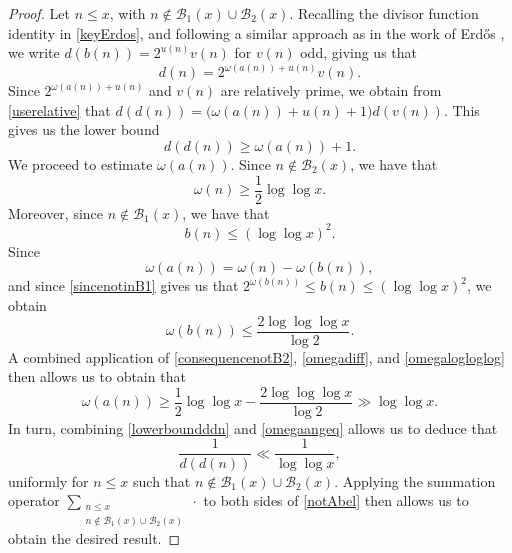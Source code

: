 \documentclass[12pt]{article}
\begin{document}
\begin{proof}
 Let \(n \le x\), with \(n \notin \mathcal{B}_1(x) \cup \mathcal{B}_2(x)\). Recalling the divisor function identity in \eqref{keyErdos}, and 
 following a similar approach as in the work of Erd\H{o}s \cite{Erdos1968}, we write $ d(b(n)) = 2^{u(n)} v(n)$ for $v(n)$ odd, giving 
 us that 
\begin{equation}\label{userelative}
 d(n) = 2^{\omega(a(n)) + u(n)} v(n).
\end{equation}
 Since $2^{\omega(a(n)) + u(n)}$ and $v(n)$ are relatively prime, we obtain from \eqref{userelative} that $ d(d(n)) = \big(\omega(a(n)) + 
 u(n) + 1\big) d(v(n))$. This gives us the lower bound 
\begin{equation}\label{lowerboundddn}
d(d(n)) \ge \omega(a(n)) + 1.
\end{equation}
 We proceed to estimate \(\omega(a(n))\). Since \(n\notin \mathcal B_2(x)\), we have that 
\begin{equation}\label{consequencenotB2}
\omega(n)\geq \frac12\log\log x.
\end{equation}
 Moreover, since \(n\notin \mathcal B_1(x)\), we have that 
\begin{equation}\label{sincenotinB1}
 b(n) \leq (\log\log x)^2.
\end{equation}
 Since 
\begin{equation}\label{omegadiff}
 \omega(a(n))=\omega(n)-\omega(b(n)), 
\end{equation}
 and since \eqref{sincenotinB1} gives us that 
$ 2^{\omega(b(n))} \leq b(n) \leq (\log\log x)^2$,
we obtain
\begin{equation}\label{omegalogloglog}
 \omega(b(n))\leq \frac{2\log\log\log x}{\log 2}.
\end{equation}
 A combined application of \eqref{consequencenotB2}, \eqref{omegadiff}, and \eqref{omegalogloglog} then allows us to obtain that 
\begin{equation}\label{omegaangeq}
 \omega(a(n)) \geq \frac12\log\log x - \frac{2\log\log\log x}{\log 2} \gg \log\log x.
\end{equation}
 In turn, combining \eqref{lowerboundddn} and \eqref{omegaangeq} allows us to deduce that 
\begin{equation}\label{notAbel}
 \frac{1}{d(d(n))} \ll \frac{1}{\log\log x}, 
\end{equation}
 uniformly for $n \leq x$ such that $n \not\in \mathcal{B}_{1}(x) \cup \mathcal{B}_{2}(x)$. Applying the summation operator 
 $\sum_{\substack{n \leq x \\ n \not\in \mathcal{B}_{1}(x) \cup \mathcal{B}_{2}(x) }} \cdot $ to both sides of \eqref{notAbel} then allows 
 us to obtain the desired result. 
\end{proof}
\end{document}
